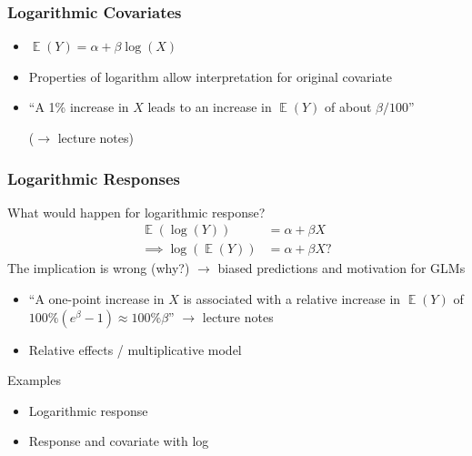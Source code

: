 \documentclass[
    utf8,
    aspectratio=169
]{beamer}  %
\DeclareMathOperator{\E}{\mathbb{E}}  %
\begin{document}
\begin{frame}
\frametitle{Logarithmic Covariates}
\begin{itemize}
	\item $\E(Y) = \alpha + \beta\log(X)$
	\item Properties of logarithm allow interpretation \alert{for original covariate}
	\item ``A 1\% increase in $X$ leads to an increase in $\E(Y)$ of about $\beta/100$''
	
	($\rightarrow$ lecture notes)
	
	\vfill
	
	\begin{example}
	\end{example}
\end{itemize}
\end{frame}

\begin{frame}
\frametitle{Logarithmic Responses}
What would happen for logarithmic response?
\begin{align*}
\E(\log(Y)) &= \alpha + \beta X \\
\implies \log(\E(Y)) &= \alpha + \beta X?
\end{align*}
The implication is wrong (why?) $\rightarrow$ biased predictions and motivation for GLMs

\begin{itemize}
	\item ``A one-point increase in $X$ is associated with a relative increase in $\E(Y)$ of $100\%(e^\beta - 1)\approx 100\% \beta$''
	$\rightarrow$ lecture notes
	\item Relative effects / multiplicative model
\end{itemize}

\begin{exampleblock}{Examples}
	\begin{itemize}
		\item Logarithmic response
		\item Response and covariate with log
	\end{itemize}
\end{exampleblock}
\end{frame}
\end{document}

